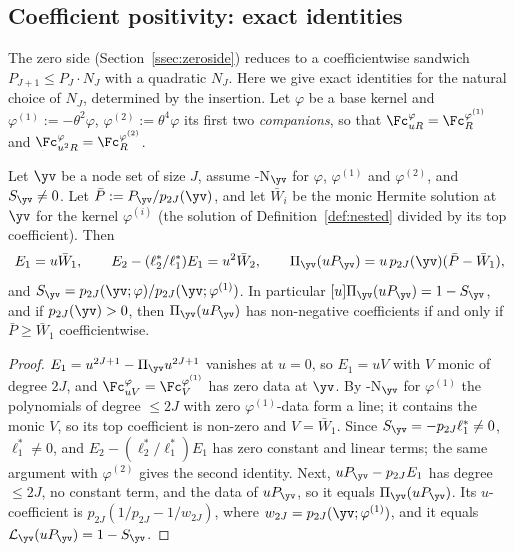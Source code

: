 \subsection{Coefficient positivity: exact identities}\label{ssec:piece1}

The zero side (Section~\ref{ssec:zeroside}) reduces to a coefficientwise sandwich $P_{J+1}\le P_J\cdot N_J$ with a quadratic
$N_J$. Here we give exact identities for the natural choice of $N_J$, determined by the insertion. Let $\varphi$ be a base
kernel and $\varphi^{(1)}:=-\theta^2\varphi$, $\varphi^{(2)}:=\theta^4\varphi$ its first two \emph{companions}, so that
$\Fc^{\varphi}_{uR}=\Fc^{\varphi^{(1)}}_R$ and $\Fc^{\varphi}_{u^2R}=\Fc^{\varphi^{(2)}}_R$.

\begin{proposition}\label{prop:companion}
Let $\yv$ be a node set of size $J$, assume \hyp{N}$_{\yv}$ for $\varphi$, $\varphi^{(1)}$ and $\varphi^{(2)}$, and $S_{\yv}\ne0$.
Let $\bar P:=P_{\yv}/p_{2J}(\yv)$, and let $\bar W_i$ be the monic Hermite solution at $\yv$ for the kernel $\varphi^{(i)}$
(the solution of Definition~\ref{def:nested} divided by its top coefficient). Then
\[
E_1=u\bar W_1,\qquad E_2-(\ell_2^*/\ell_1^*)E_1=u^2\bar W_2,\qquad \Pi_{\yv}(uP_{\yv})=u\,p_{2J}(\yv)(\bar P-\bar W_1),
\]
and $S_{\yv}=p_{2J}(\yv;\varphi)/p_{2J}(\yv;\varphi^{(1)})$. In particular $[u]\Pi_{\yv}(uP_{\yv})=1-S_{\yv}$, and if
$p_{2J}(\yv)>0$, then $\Pi_{\yv}(uP_{\yv})$ has non-negative coefficients if and only if $\bar P\ge\bar W_1$ coefficientwise.
\end{proposition}

\begin{proof}
$E_1=u^{2J+1}-\Pi_{\yv}u^{2J+1}$ vanishes at $u=0$, so $E_1=uV$ with $V$ monic of degree $2J$, and $\Fc^{\varphi}_{uV}=\Fc^{\varphi^{(1)}}_V$
has zero data at $\yv$. By \hyp{N}$_{\yv}$ for $\varphi^{(1)}$ the polynomials of degree $\le2J$ with zero
$\varphi^{(1)}$-data form a line; it contains the monic $V$, so its top coefficient is non-zero and $V=\bar W_1$. Since
$S_{\yv}=-p_{2J}\ell_1^*\ne0$, $\ell_1^*\ne0$, and $E_2-(\ell_2^*/\ell_1^*)E_1$ has zero constant and linear terms; the same
argument with $\varphi^{(2)}$ gives the second identity. Next, $uP_{\yv}-p_{2J}E_1$ has degree $\le2J$, no constant term, and
the data of $uP_{\yv}$, so it equals $\Pi_{\yv}(uP_{\yv})$. Its $u$-coefficient is $p_{2J}(1/p_{2J}-1/w_{2J})$, where
$w_{2J}=p_{2J}(\yv;\varphi^{(1)})$, and it equals $\mathcal L_{\yv}(uP_{\yv})=1-S_{\yv}$.
\end{proof}

